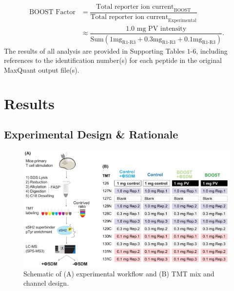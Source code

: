 \documentclass[journal=jprobs,manuscript=article]{achemso}
\begin{document}
\begin{equation}
\begin{aligned}
\text{BOOST Factor} & =  \dfrac{\text{Total reporter ion current}_{\text{BOOST}}}{\text{Total reporter ion current}_{\text{Experimental}}} \\
& \approx \dfrac{1.0\text{ mg PV intensity}}{\text{Sum}(1\text{mg}_{\text{R1-R3}} + 0.3\text{mg}_{\text{R1-R3}} + 0.1\text{mg}_{\text{R1-R3}})}.
\end{aligned}
\end{equation}
The results of all analysis are provided in Supporting Tables $1$-$6$, including references to the identification number(s) for each peptide in the original MaxQuant output file(s). 


\section{Results}



\subsection{Experimental Design \& Rationale}

\begin{figure}[!h]
\centering
\includegraphics[width=150mm]{figures/main_figs/experimental_design.pdf}
\caption{Schematic of (A) experimental workflow and (B) TMT mix and channel design.}\label{experimental_design}
\end{figure}
\end{document}
